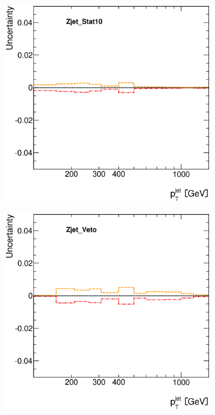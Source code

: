 \documentclass[12pt, twoside]{article}
\numberwithin{equation}{section}
\numberwithin{figure}{section}
\newenvironment{changemargin}[2]{%
\begin{list}{}{%
\setlength{\topsep}{0pt}%
\setlength{\leftmargin}{#1}%
\setlength{\rightmargin}{#2}%
\setlength{\listparindent}{\parindent}%
\setlength{\itemindent}{\parindent}%
\setlength{\parsep}{\parskip}%
}%
\item[]}{\end{list}}
\begin{document}
\begin{figure}[H]
\begin{changemargin}{-1.0cm}{-0.75cm}
\begin{changemargin}{-0.75cm}{-1.0cm}
        \hspace{-0.526\textwidth}
        \begin{subfigure}[b]{0.25\textwidth}
            \includegraphics[width=\textwidth]{./images/JetSystematics/JetSystematic-57.eps}
        \end{subfigure}
        \begin{subfigure}[b]{0.25\textwidth}
            \includegraphics[width=\textwidth]{./images/JetSystematics/JetSystematic-58.eps}
        \end{subfigure}
    \end{changemargin}


\end{changemargin}
\end{figure}
\end{document}
